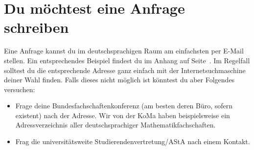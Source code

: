 \section{Du möchtest eine Anfrage schreiben}\label{sec:anfrage}
Eine Anfrage kannst du im deutschsprachigen Raum am einfachsten per E-Mail stellen. Ein entsprechendes Beispiel findest du im Anhang auf Seite~\pageref{sec:musteranfrage}. Im Regelfall solltest du die entsprechende Adresse ganz einfach mit der Internetsuchmaschine deiner Wahl finden. Falls dieses nicht möglich ist könntest du aber Folgendes versuchen:
\begin{itemize}
\item Frage deine Bundesfachschaftenkonferenz (am besten deren Büro, sofern existent) nach der Adresse. Wir von der KoMa haben beispielsweise ein Adressverzeichnis aller deutschsprachiger Mathematikfachschaften.
\item Frag die universitätsweite Studierendenvertretung/AStA nach einem Kontakt.
\end{itemize}

